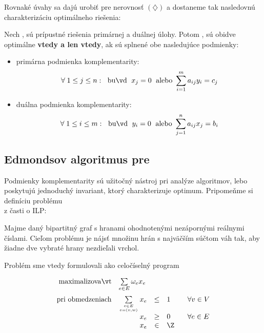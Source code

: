 \noindent
Rovnaké úvahy sa dajú urobiť pre nerovnosť $(\diamondsuit)$ a dostaneme tak nasledovnú charakterizáciu
optimálneho riešenia:

\begin{framed}
\begin{veta}
  \label{thm:slackness}
Nech ,  sú prípustné riešenia primárnej a duálnej úlohy. 
Potom ,  sú obidve optimálne {\bf vtedy a len vtedy}, ak
sú splnené obe nasledujúce podmienky:

\begin{itemize}
\item primárna podmienka komplementarity:
$$\forall\;1\le j\le n:\;{\rm\ buď\ }\; x_j=0\; {\rm\ alebo\ }\sum_{i=1}^ma_{ij}y_i=c_j$$
\item duálna podmienka komplementarity:
$$\forall\;1\le i\le m:\;{\rm\ buď\ }\; y_i=0\; {\rm\ alebo\ }\sum_{j=1}^na_{ij}x_j=b_i$$
\end{itemize}
\end{veta}
\end{framed}

\subsection*{Edmondsov algoritmus pre \minfactor}

\noindent
Podmienky komplementarity sú užitočný nástroj pri analýze algoritmov, lebo poskytujú jednoduchý invariant,
ktorý charakterizuje optimum. Pripomeňme si definíciu problému\\ \maxWBmatching z časti o ILP:

{
  \renewcommand{\thedummy}{\ref{dfn:maxWBmatching}}
  \begin{dfn}
    Majme daný bipartitný graf s hranami ohodnotenými nezápornými reálnymi
    číslami. Cieľom problému \maxWBmatching je nájsť množinu hrán s najväčším
    súčtom váh tak, aby žiadne dve vybraté hrany nezdieľali vrchol.
  \end{dfn}
}

\noindent
Problém sme vtedy formulovali ako celočíselný program

\begin{equation*}
\begin{array}{rrcll}
  {\rm maximalizovať}     & \multicolumn{1}{l}{\sum\limits_{e\in E}\omega_ex_e}\\[3ex]
  {\rm pri\ obmedzeniach} & \sum\limits_{e\in E\atop e=(v,w)}x_e&\le&1& \;\;\;\forall v\in V\\
                          & x_e&\ge&0& \;\;\;\forall e\in E\\
                          & x_e&\in&\Z
\end{array}
\end{equation*}

